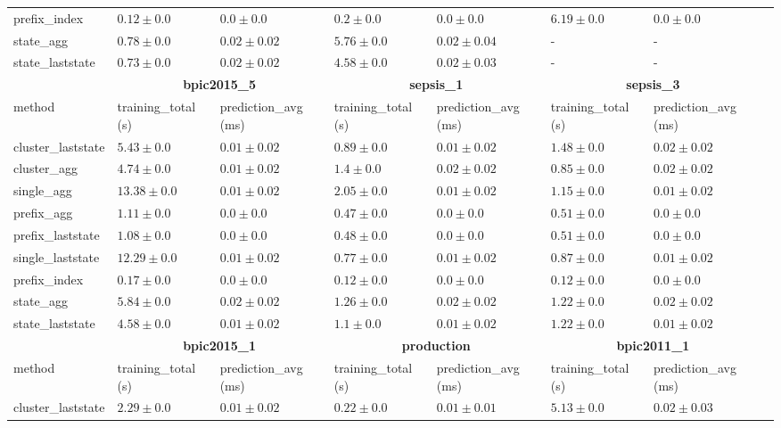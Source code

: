 \documentclass[twoside,11pt]{Latex/Classes/PhDthesisPSnPDF}
\begin{document}
\begin{table}[!htbp]
{\begin{tabular}{llllllll}
					prefix\_index & $\mathbf{0.12 \pm 0.0}$ & $\mathbf{0.0 \pm 0.0}$ & $\mathbf{0.2 \pm 0.0}$ & $\mathbf{0.0 \pm 0.0}$ & $\mathbf{6.19 \pm 0.0}$ & $\mathbf{0.0 \pm 0.0}$ \\ 
					state\_agg & $0.78 \pm 0.0$ & $0.02 \pm 0.02$ & $5.76 \pm 0.0$ & $0.02 \pm 0.04$ & - & - \\ 
					state\_laststate & $0.73 \pm 0.0$ & $0.02 \pm 0.02$ & $4.58 \pm 0.0$ & $0.02 \pm 0.03$ & - & - \\ 
					\bottomrule
					\toprule
					& \multicolumn{2}{c}{{\bfseries bpic2015\_5}} & \multicolumn{2}{c}{{\bfseries sepsis\_1}} & \multicolumn{2}{c}{{\bfseries sepsis\_3}} \\ \cmidrule(lr){2-3} \cmidrule(lr){4-5} \cmidrule(lr){6-7}
					method  & training\_total (s) & prediction\_avg (ms) & training\_total (s) & prediction\_avg (ms) & training\_total (s) & prediction\_avg (ms) \\ \midrule
					cluster\_laststate & $5.43 \pm 0.0$ & $0.01 \pm 0.02$ & $0.89 \pm 0.0$ & $0.01 \pm 0.02$ & $1.48 \pm 0.0$ & $0.02 \pm 0.02$ \\ 
					cluster\_agg & $4.74 \pm 0.0$ & $0.01 \pm 0.02$ & $1.4 \pm 0.0$ & $0.02 \pm 0.02$ & $0.85 \pm 0.0$ & $0.02 \pm 0.02$ \\ 
					single\_agg & $13.38 \pm 0.0$ & $0.01 \pm 0.02$ & $2.05 \pm 0.0$ & $0.01 \pm 0.02$ & $1.15 \pm 0.0$ & $0.01 \pm 0.02$ \\ 
					prefix\_agg & $1.11 \pm 0.0$ & $\mathbf{0.0 \pm 0.0}$ & $0.47 \pm 0.0$ & $\mathbf{0.0 \pm 0.0}$ & $0.51 \pm 0.0$ & $\mathbf{0.0 \pm 0.0}$ \\ 
					prefix\_laststate & $1.08 \pm 0.0$ & $\mathbf{0.0 \pm 0.0}$ & $0.48 \pm 0.0$ & $\mathbf{0.0 \pm 0.0}$ & $0.51 \pm 0.0$ & $\mathbf{0.0 \pm 0.0}$ \\ 
					single\_laststate & $12.29 \pm 0.0$ & $0.01 \pm 0.02$ & $0.77 \pm 0.0$ & $0.01 \pm 0.02$ & $0.87 \pm 0.0$ & $0.01 \pm 0.02$ \\ 
					prefix\_index & $\mathbf{0.17 \pm 0.0}$ & $\mathbf{0.0 \pm 0.0}$ & $\mathbf{0.12 \pm 0.0}$ & $\mathbf{0.0 \pm 0.0}$ & $\mathbf{0.12 \pm 0.0}$ & $\mathbf{0.0 \pm 0.0}$ \\ 
					state\_agg & $5.84 \pm 0.0$ & $0.02 \pm 0.02$ & $1.26 \pm 0.0$ & $0.02 \pm 0.02$ & $1.22 \pm 0.0$ & $0.02 \pm 0.02$ \\ 
					state\_laststate & $4.58 \pm 0.0$ & $0.01 \pm 0.02$ & $1.1 \pm 0.0$ & $0.01 \pm 0.02$ & $1.22 \pm 0.0$ & $0.01 \pm 0.02$ \\ 
					\bottomrule
					\toprule
					& \multicolumn{2}{c}{{\bfseries bpic2015\_1}} & \multicolumn{2}{c}{{\bfseries production}} & \multicolumn{2}{c}{{\bfseries bpic2011\_1}} \\ \cmidrule(lr){2-3} \cmidrule(lr){4-5} \cmidrule(lr){6-7}
					method  & training\_total (s) & prediction\_avg (ms) & training\_total (s) & prediction\_avg (ms) & training\_total (s) & prediction\_avg (ms) \\ \midrule
					cluster\_laststate & $2.29 \pm 0.0$ & $0.01 \pm 0.02$ & $0.22 \pm 0.0$ & $0.01 \pm 0.01$ & $5.13 \pm 0.0$ & $0.02 \pm 0.03$ \\ 
					

\end{tabular}}
\end{table}
\end{document}
